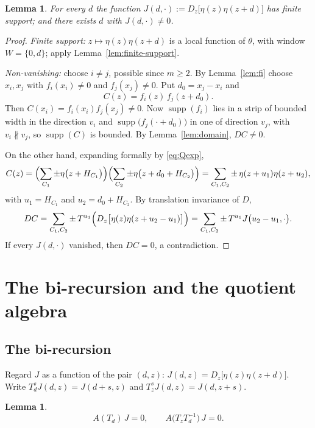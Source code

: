 \documentclass[11pt,reqno]{amsart}
\theoremstyle{plain}
\newtheorem{lem}[thm]{Lemma}
\theoremstyle{definition}
\theoremstyle{remark}
\theoremstyle{plain}
\theoremstyle{remark}
\theoremstyle{definition}
\numberwithin{equation}{section}
\DeclareMathOperator{\supp}{supp}
\begin{document}
\begin{lem}\label{lem:J-nonzero}
For every $d$ the function $J(d,\cdot):=D_z\bigl[\eta(z)\eta(z+d)\bigr]$ has
finite support; and there exists $d$ with $J(d,\cdot)\ne0$.
\end{lem}

\begin{proof}
\emph{Finite support:} $z\mapsto\eta(z)\eta(z+d)$ is a local function of
$\theta$, with window $W=\{0,d\}$; apply Lemma~\ref{lem:finite-support}.

\emph{Non-vanishing:} choose $i\ne j$, possible since $m\ge2$.  By
Lemma~\ref{lem:fi} choose $x_i,x_j$ with $f_i(x_i)\ne0$ and $f_j(x_j)\ne0$.  Put
$d_0=x_j-x_i$ and
\[C(z)=f_i(z)\,f_j(z+d_0).\]
Then $C(x_i)=f_i(x_i)f_j(x_j)\ne0$.  Now $\supp(f_i)$ lies in a strip of bounded
width in the direction $v_i$ and $\supp\bigl(f_j(\cdot+d_0)\bigr)$ in one of
direction $v_j$, with $v_i\not\parallel v_j$, so $\supp(C)$ is bounded.  By
Lemma~\ref{lem:domain}, $DC\ne0$.

On the other hand, expanding formally by \eqref{eq:Qexp},
\[C(z)=\Bigl(\sum_{C_1}\pm\eta\bigl(z+H_{C_1}\bigr)\Bigr)
       \Bigl(\sum_{C_2}\pm\eta\bigl(z+d_0+H_{C_2}\bigr)\Bigr)
      =\sum_{C_1,C_2}\pm\,\eta(z+u_1)\eta(z+u_2),\]
with $u_1=H_{C_1}$ and $u_2=d_0+H_{C_2}$.  By translation invariance of $D$,
\[DC=\sum_{C_1,C_2}\pm\,T^{u_1}\Bigl(D_z\bigl[\eta(z)\eta(z+u_2-u_1)\bigr]\Bigr)
    =\sum_{C_1,C_2}\pm\,T^{u_1}J\bigl(u_2-u_1,\cdot\bigr).\]
If every $J(d,\cdot)$ vanished, then $DC=0$, a contradiction.
\end{proof}

\section{The bi-recursion and the quotient algebra}\label{sec:quotient}

\subsection{The bi-recursion}

Regard $J$ as a function of the pair $(d,z)$:
$J(d,z)=D_z\bigl[\eta(z)\eta(z+d)\bigr]$.  Write $T_d^sJ(d,z)=J(d+s,z)$ and
$T_z^sJ(d,z)=J(d,z+s)$.

\begin{lem}\label{lem:birecursion}
\begin{equation}
A(T_d)\,J=0,\qquad A\bigl(T_zT_d^{-1}\bigr)\,J=0 . \label{eq:birec}
\end{equation}
\end{lem}
\end{document}
